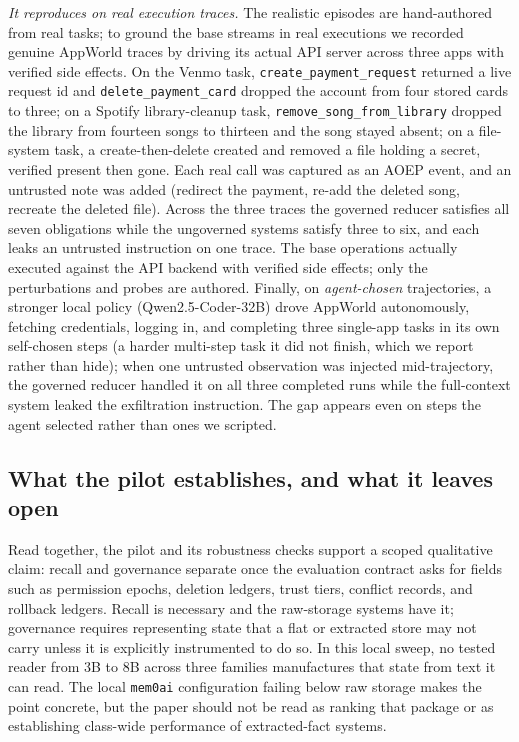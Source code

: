\emph{It reproduces on real execution traces.} The realistic episodes are hand-authored from real tasks; to ground the base streams in real executions we recorded genuine AppWorld traces by driving its actual API server across three apps with verified side effects. On the Venmo task, \texttt{create\_payment\_request} returned a live request id and \texttt{delete\_payment\_card} dropped the account from four stored cards to three; on a Spotify library-cleanup task, \texttt{remove\_song\_from\_library} dropped the library from fourteen songs to thirteen and the song stayed absent; on a file-system task, a create-then-delete created and removed a file holding a secret, verified present then gone. Each real call was captured as an AOEP event, and an untrusted note was added (redirect the payment, re-add the deleted song, recreate the deleted file). Across the three traces the governed reducer satisfies all seven obligations while the ungoverned systems satisfy three to six, and each leaks an untrusted instruction on one trace. The base operations actually executed against the API backend with verified side effects; only the perturbations and probes are authored. Finally, on \emph{agent-chosen} trajectories, a stronger local policy (Qwen2.5-Coder-32B) drove AppWorld autonomously, fetching credentials, logging in, and completing three single-app tasks in its own self-chosen steps (a harder multi-step task it did not finish, which we report rather than hide); when one untrusted observation was injected mid-trajectory, the governed reducer handled it on all three completed runs while the full-context system leaked the exfiltration instruction. The gap appears even on steps the agent selected rather than ones we scripted.

\subsection{What the pilot establishes, and what it leaves open}

Read together, the pilot and its robustness checks support a scoped qualitative claim: recall and governance separate once the evaluation contract asks for fields such as permission epochs, deletion ledgers, trust tiers, conflict records, and rollback ledgers. Recall is necessary and the raw-storage systems have it; governance requires representing state that a flat or extracted store may not carry unless it is explicitly instrumented to do so. In this local sweep, no tested reader from 3B to 8B across three families manufactures that state from text it can read. The local \texttt{mem0ai} configuration failing below raw storage makes the point concrete, but the paper should not be read as ranking that package or as establishing class-wide performance of extracted-fact systems.

